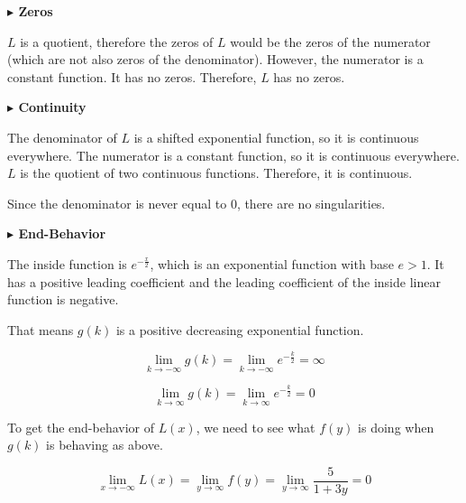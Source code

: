 \documentclass{ximera}
\begin{document}
\textbf{\textcolor{blue!55!black}{$\blacktriangleright$ Zeros}} 



$L$ is a quotient, therefore the zeros of $L$ would be the zeros of the numerator (which are not also zeros of the denominator).  However, the numerator is a constant function.  It has no zeros. Therefore, $L$ has no zeros.










\textbf{\textcolor{blue!55!black}{$\blacktriangleright$ Continuity}} 


The denominator of $L$ is a shifted exponential function, so it is continuous everywhere. The numerator is a constant function, so it is continuous everywhere.  $L$ is the quotient of two continuous functions.  Therefore, it is continuous. 


Since the denominator is never equal to $0$, there are no singularities. 














\textbf{\textcolor{blue!55!black}{$\blacktriangleright$ End-Behavior}} 


The inside function is $e^{-\tfrac{x}{2}}$, which is an exponential function with base $e > 1$.  It has a positive leading coefficient and the leading coefficient of the inside linear function is negative. 

That means $g(k)$ is a positive decreasing exponential function. 



\[  
\lim\limits_{k \to -\infty}g(k) = \lim\limits_{k \to -\infty}e^{-\tfrac{k}{2}} = \infty
\]




\[  
\lim\limits_{k \to \infty}g(k) = \lim\limits_{k \to \infty}e^{-\tfrac{k}{2}} = 0
\]




To get the end-behavior of $L(x)$, we need to see what $f(y)$ is doing when $g(k)$ is behaving as above. 





\[  
\lim\limits_{x \to -\infty}L(x) = \lim\limits_{y \to \infty}f(y) = \lim\limits_{y \to \infty}\frac{5}{1 + 3 y} = 0
\]
\end{document}
